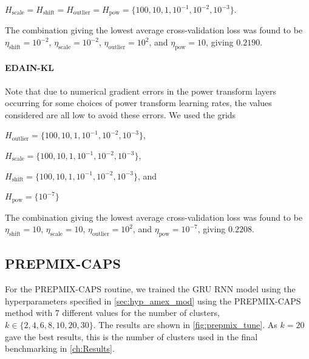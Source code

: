 \documentclass{statsmsc}
\begin{document}
{$H_{\textrm{scale}}=H_{\textrm{shift}}=H_{\textrm{outlier}}=H_{\textrm{pow}}=\{100,
10, 1, 10^{-1}, 10^{-2}, 10^{-3}\}$.

The combination giving the lowest average cross-validation loss was found to be
$\eta_{\textrm{shift}}=10^{-2}$,
$\eta_{\textrm{scale}}=10^{-2}$,
$\eta_{\textrm{outlier}}=10^{2}$, and
$\eta_{\textrm{pow}}=10$, giving $0.2190$.

\paragraph{EDAIN-KL}%

Note that due to numerical gradient errors in the power transform layers occurring for some
choices of power transform learning rates, the values considered are all low to avoid these
errors. We used the grids

$H_{\textrm{outlier}}=\{100, 10, 1, 10^{-1}, 10^{-2}, 10^{-3}\}$,

$H_{\textrm{scale}}=\{100, 10, 1, 10^{-1}, 10^{-2}, 10^{-3}\}$,

$H_{\textrm{shift}}=\{100, 10, 1, 10^{-1}, 10^{-2}, 10^{-3}\}$, and

$H_{\textrm{pow}}=\{10^{-7}\}$

The combination giving the lowest average cross-validation loss was found to be
$\eta_{\textrm{shift}}=10$,
$\eta_{\textrm{scale}}=10$,
$\eta_{\textrm{outlier}}=10^{2}$, and
$\eta_{\textrm{pow}}=10^{-7}$, giving $0.2208$.

\subsection{PREPMIX-CAPS}

For the \ac{PREPMIX-CAPS} routine, we trained the \ac{GRU} \ac{RNN} model
using the hyperparameters specified in \cref{sec:hyp_amex_mod} using the \ac{PREPMIX-CAPS}
method with 7 different values for the number of clusters, $k \in \{2, 4, 6, 8, 10, 20, 30\}$.
The results are shown in \cref{fig:prepmix_tune}. As $k=20$ gave the best results, this is
the number of clusters used in the final benchmarking in \cref{ch:Results}.

}
\end{document}
